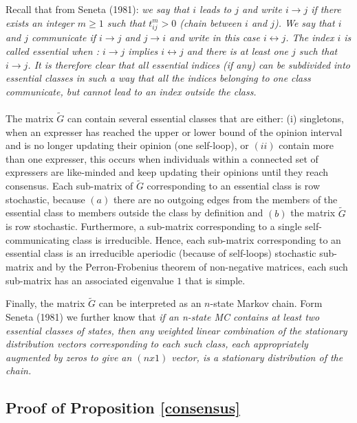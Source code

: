 \documentclass{article}
\begin{document}
 Recall that from Seneta (1981)\cite{seneta}: \textit{we say that $i$ leads to $j$ and write $i \rightarrow j$ if there exists an integer $m \geq 1$ such that $t_{ij}^{m} > 0$ (chain between $i$ and $j$). We say that $i$ and $j$ communicate if $i \rightarrow j$ and $j \rightarrow i$ and write in this case $i \leftrightarrow j$. The index $i$ is called essential when : $i \rightarrow j$ implies $i \leftrightarrow j$ and there is at least one $j$ such that $i \rightarrow j$. It is therefore clear that all essential indices (if any) can be subdivided into essential classes in such a way that all the indices belonging to one class communicate, but cannot lead to an index outside the class.} \\
\\ The matrix $\tilde{G}$ can contain several essential classes that are either: (i) singletons, when an expresser has reached the upper or lower bound of the opinion interval and is no longer updating their opinion (one self-loop), or $(ii)$ contain more than one expresser, this occurs when individuals within a connected set of expressers are like-minded and keep updating their opinions until they reach consensus. Each sub-matrix of $\tilde{G}$ corresponding to an essential class is row stochastic, because $(a)$ there are no outgoing edges from the members of the essential class to members outside the class by definition and $(b)$ the matrix $\tilde{G}$ is row stochastic. Furthermore, a sub-matrix corresponding to a single self-communicating class is irreducible. Hence, each sub-matrix corresponding to an essential class is an irreducible aperiodic (because of self-loops) stochastic sub-matrix and by the Perron-Frobenius theorem of non-negative matrices, each such sub-matrix has an associated eigenvalue $1$ that is simple.

\bigskip

Finally, the matrix $\tilde{G}$ can be interpreted as an $n$-state Markov chain. Form Seneta (1981) we further know that \textit{if an n-state MC contains at least two essential classes of states, then any weighted linear combination of the stationary distribution vectors corresponding to each such class, each appropriately augmented by zeros to give an $(n x 1)$ vector, is a stationary distribution of the chain.} 
  
\subsection{Proof of Proposition \ref{consensus}} \label{proofconsensus}
\end{document}
